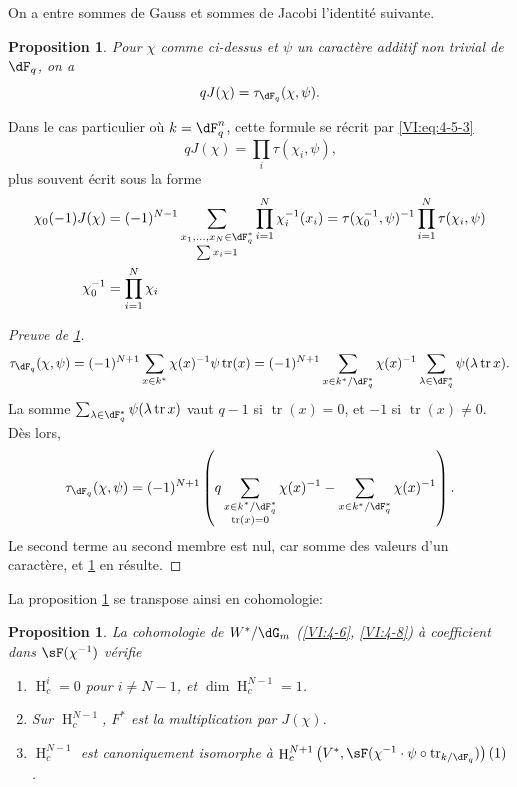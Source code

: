 \documentclass[oneside]{book}
\DeclareMathOperator{\h}{H}
\DeclareMathOperator{\tr}{tr}
\theoremstyle{sga-source}
\theoremstyle{sga-source-dash}
\theoremstyle{sga-source-dotdash}
\theoremstyle{sga-source-number-note-dash}
\theoremstyle{sga-source-note-number-dotdash}
\theoremstyle{sga-source-example-dotdash}
\theoremstyle{sga-source-inline-number}
\theoremstyle{sga-source-bare-number}
\theoremstyle{sga-source}
\newtheorem{proposition_}[subsection]{Proposition}
\newcommand{\PrintPage}[1]{}\newcommand{\MathPage}[1]{}\newcommand{\PrintCite}[2]{#1}\newcommand{\var}[3]{#2}
\begin{document}
On a entre sommes de Gauss et sommes de Jacobi l'identité suivante. 





\PrintPage{204}
\begin{proposition_}\label{VI:4-15}
Pour $\chi$ comme ci-dessus et $\psi$ un caractère additif non trivial de 
$\dF_q$, on a 
\[
  q J(\chi) = \tau_{\dF_q}(\chi,\psi) \text{.} 
\]
\end{proposition_}

Dans le cas particulier où $k=\dF_q^n$, cette formule se récrit par 
\eqref{VI:eq:4-5-3} 
\begin{equation*}\tag{4.15.1}\label{VI:eq:4-15-1}
  q J(\chi) = \prod_i \tau(\chi_i,\psi) \text{,} 
\end{equation*}
plus souvent écrit sous la forme 
\begin{align*}
  \chi_0(-1) J(\chi) &= (-1)^{N-1} \sum_{\substack{x_1,\dots,x_N\in \dF_q^\ast \\ \sum x_i = 1}} \prod_{i=1}^N \chi_i^{-1}(x_i) = \tau(\chi_0^{-1},\psi)^{-1} \prod_{i=1}^N \tau(\chi_i,\psi) \\
  \chi_0^{-1} &= \prod_{i=1}^N \chi_i 
\end{align*}





\begin{proof}[Preuve de \ref{VI:4-15}]
\[
  \tau_{\dF_q}(\chi,\psi) = (-1)^{N+1} \sum_{x\in k^\ast} \chi(x)^{-1} \psi \tr(x) = (-1)^{N+1} \sum_{x\in k^\ast/\dF_q^\ast} \chi(x)^{-1} \sum_{\lambda\in \dF_q^\ast} \psi(\lambda \tr x) \text{.}
\]
La somme $\sum_{\lambda\in \dF_q^\ast} \psi(\lambda \tr x)$ vaut $q-1$ si 
$\tr(x)=0$, et $-1$ si $\tr(x)\ne 0$. Dès lors, 
\[
  \tau_{\dF_q}(\chi,\psi) = (-1)^{N+1} \left(\var{q\sum_{x\in k^\ast/\dF_q^\ast} \chi(x)^{-1}}{q\sum_{\substack{x\in k^\ast/\dF_q^\ast\\\tr(x)=0}} \chi(x)^{-1}}{S45-SOL-0843} - \sum_{x\in k^\ast/\dF_q^\ast} \chi(x)^{-1}\right) \text{.}
\]
Le second terme au second membre est nul, car somme des valeurs d'un 
caractère, et \ref{VI:4-15} en résulte. 
\end{proof}

La proposition \ref{VI:4-15} se transpose ainsi en cohomologie: 





\begin{proposition_}\label{VI:4-16}
La cohomologie de $W^\ast/\dG_m$ (\ref{VI:4-6}, \ref{VI:4-8}) à coefficient 
dans $\sF(\chi^{-1})$ vérifie 
\begin{enumerate}[\indent (i)]
  \item $\h_c^i=0$ pour $i\ne N-1$, et $\dim \h_c^{N-1}{}=1$. 
  \item Sur $\h_c^{N-1}$, $F^\ast$ est la multiplication par $J(\chi)$. 
  \item $\h_c^{N-1}$ est canoniquement isomorphe à 
    $\h_c^{N+1}\left(V^\ast,\sF(\chi^{-1}\cdot \psi\circ \tr_{k/\dF_q})\right)(1)$. 
\end{enumerate}
\end{proposition_}
\end{document}
